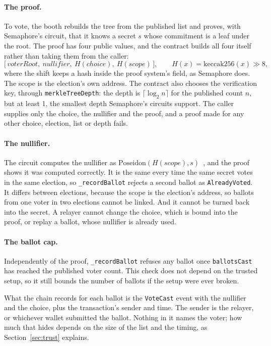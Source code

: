 \paragraph{The proof.} To vote, the booth rebuilds the tree from the published
list and proves, with Semaphore's circuit, that it knows a secret $s$ whose
commitment is a leaf under the root. The proof has four public values, and the
contract builds all four itself rather than taking them from the caller:
\[
  \bigl[\,\mathit{voterRoot},\ \mathit{nullifier},\ H(\mathit{choice}),\
  H(\mathit{scope})\,\bigr],
  \qquad H(x) = \mathrm{keccak256}(x) \gg 8,
\]
where the shift keeps a hash inside the proof system's field, as Semaphore
does. The scope is the election's own address. The contract also chooses the
verification key, through \texttt{merkleTreeDepth}: the depth is
$\lceil \log_2 n \rceil$ for the published count $n$, but at least 1, the
smallest depth Semaphore's circuits support. The caller supplies only the
choice, the nullifier and the proof, and a proof made for any other choice,
election, list or depth fails.

\paragraph{The nullifier.} The circuit computes the nullifier as
$\mathrm{Poseidon}(H(\mathit{scope}), s)$~\cite{semaphorecircuit}, and the
proof shows it was computed correctly. It is the same every time the same
secret votes in the same election, so \texttt{\_recordBallot} rejects a second
ballot as \texttt{AlreadyVoted}. It differs between elections, because the
scope is the election's address, so ballots from one voter in two elections
cannot be linked. And it cannot be turned back into the secret. A relayer
cannot change the choice, which is bound into the proof, or replay a ballot,
whose nullifier is already used.

\paragraph{The ballot cap.} Independently of the proof, \texttt{\_recordBallot}
refuses any ballot once \texttt{ballotsCast} has reached the published voter
count. This check does not depend on the trusted setup, so it still bounds the
number of ballots if the setup were ever broken.

What the chain records for each ballot is the \texttt{VoteCast} event with the
nullifier and the choice, plus the transaction's sender and time. The sender is
the relayer, or whichever wallet submitted the ballot. Nothing in it names the
voter; how much that hides depends on the size of the list and the timing,
as Section~\ref{sec:trust} explains.

